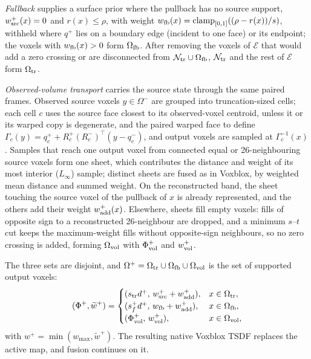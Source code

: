 \emph{Fallback} supplies a surface prior where the pullback has no source
support, $w_{\rm src}^+(x)=0$ and $r(x)\le\rho$, with weight
$w_{\rm fb}(x)=\operatorname{clamp}_{[0,1]}((\rho-r(x))/s)$, withheld where
$q^+$ lies on a boundary edge (incident to one face) or its endpoint; the
voxels with $w_{\rm fb}(x)>0$ form $\Omega_{\rm fb}$. After removing the
voxels of $\mathcal E$ that would add a zero crossing or are disconnected from
$\mathcal N_{\rm tr}\cup\Omega_{\rm fb}$, $\mathcal N_{\rm tr}$ and the rest of
$\mathcal E$ form $\Omega_{\rm tr}$.

\emph{Observed-volume transport} carries the source state through the same
paired frames. Observed source voxels $y\in\Omega^-$ are grouped into
truncation-sized cells; each cell $c$ uses the source face closest to its
observed-voxel centroid, unless it or its warped copy is degenerate, and the
paired warped face to define $\Gamma_c(y)=q_c^++R_c^+(R_c^-)^\top(y-q_c^-)$,
and output voxels are sampled at $\Gamma_c^{-1}(x)$. Samples that reach one
output voxel from connected equal or 26-neighbouring source voxels form one
sheet, which contributes the distance and weight of its most interior ($L_\infty$) sample;
distinct sheets are fused as in Voxblox, by weighted mean distance and summed
weight. On the reconstructed band, the sheet touching the source voxel of the
pullback of $x$ is already represented, and the others add their weight
$w_{\rm add}^+(x)$.
Elsewhere, sheets fill empty voxels: fills of opposite sign to a reconstructed
26-neighbour are dropped, and a minimum $s$--$t$ cut keeps the
maximum-weight fills without opposite-sign neighbours, so no zero crossing is
added, forming $\Omega_{\rm vol}$ with $\Phi_{\rm vol}^+$ and $w_{\rm vol}^+$.

The three sets are disjoint, and
$\Omega^+=\Omega_{\rm tr}\cup\Omega_{\rm fb}\cup\Omega_{\rm vol}$ is the set of
supported output voxels:
\begin{equation}
(\Phi^+,\widetilde w^+)=\begin{cases}
(s_{\rm tr}d^+,\,w_{\rm src}^++w_{\rm add}^+), & x\in\Omega_{\rm tr},\\
(s_f^+d^+,\,w_{\rm fb}+w_{\rm add}^+), & x\in\Omega_{\rm fb},\\
(\Phi_{\rm vol}^+,\,w_{\rm vol}^+), & x\in\Omega_{\rm vol},
\end{cases}
\label{eq:hybrid_tsdf}
\end{equation}
with $w^+=\min(w_{\max},\widetilde w^+)$. The resulting native Voxblox TSDF
replaces the active map, and fusion continues on it.


